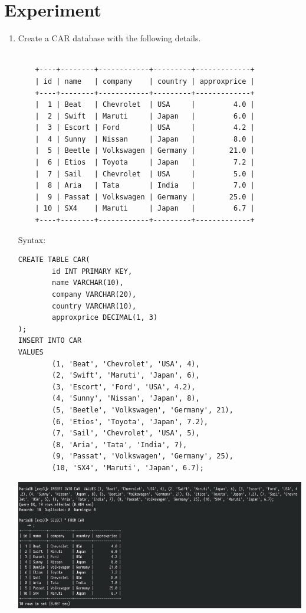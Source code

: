\documentclass[13pt,oneside]{book}
\begin{document}
\section*{Experiment}
	\begin{enumerate}
\item
Create a CAR database with the following details.
\begin{verbatim}

	+----+--------+------------+---------+-------------+
	| id | name   | company    | country | approxprice |
	+----+--------+------------+---------+-------------+
	|  1 | Beat   | Chevrolet  | USA     |         4.0 |
	|  2 | Swift  | Maruti     | Japan   |         6.0 |
	|  3 | Escort | Ford       | USA     |         4.2 |
	|  4 | Sunny  | Nissan     | Japan   |         8.0 |
	|  5 | Beetle | Volkswagen | Germany |        21.0 |
	|  6 | Etios  | Toyota     | Japan   |         7.2 |
	|  7 | Sail   | Chevrolet  | USA     |         5.0 |
	|  8 | Aria   | Tata       | India   |         7.0 |
	|  9 | Passat | Volkswagen | Germany |        25.0 |
	| 10 | SX4    | Maruti     | Japan   |         6.7 |
	+----+--------+------------+---------+-------------+
\end{verbatim}
 
Syntax:
\begin{verbatim}
CREATE TABLE CAR(
        id INT PRIMARY KEY,
        name VARCHAR(10),
        company VARCHAR(20),
        country VARCHAR(10),
        approxprice DECIMAL(1, 3)
);
INSERT INTO CAR 
VALUES
        (1, 'Beat', 'Chevrolet', 'USA', 4),
        (2, 'Swift', 'Maruti', 'Japan', 6),
        (3, 'Escort', 'Ford', 'USA', 4.2),
        (4, 'Sunny', 'Nissan', 'Japan', 8),
        (5, 'Beetle', 'Volkswagen', 'Germany', 21),
        (6, 'Etios', 'Toyota', 'Japan', 7.2),
        (7, 'Sail', 'Chevrolet', 'USA', 5),
        (8, 'Aria', 'Tata', 'India', 7),
        (9, 'Passat', 'Volkswagen', 'Germany', 25),
        (10, 'SX4', 'Maruti', 'Japan', 6.7);

\end{verbatim}
\includegraphics[width=\textwidth]{img/p3/ss1.png}



\end{enumerate}
\end{document}
